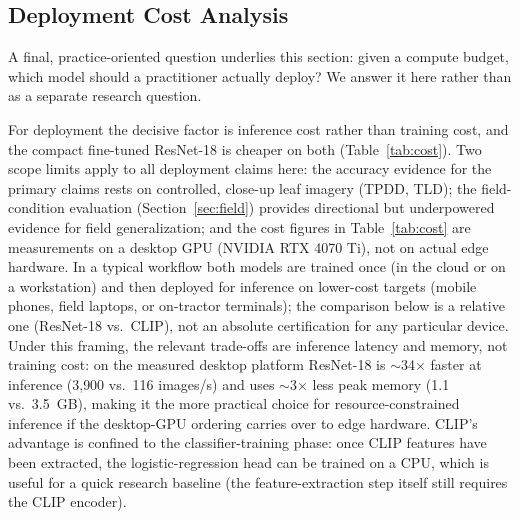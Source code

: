 \documentclass[10pt,a4paper]{article}
\begin{document}
\subsection{Deployment Cost Analysis}

A final, practice-oriented question underlies this section: given a compute budget, which model should a practitioner actually deploy? We answer it here rather than as a separate research question.

For deployment the decisive factor is inference cost rather than training cost, and the compact fine-tuned ResNet-18 is cheaper on both (Table~\ref{tab:cost}). Two scope limits apply to all deployment claims here: the accuracy evidence for the primary claims rests on controlled, close-up leaf imagery (TPDD, TLD); the field-condition evaluation (Section~\ref{sec:field}) provides directional but underpowered evidence for field generalization; and the cost figures in Table~\ref{tab:cost} are measurements on a desktop GPU (NVIDIA RTX 4070 Ti), not on actual edge hardware.
In a typical workflow both models are trained once (in the cloud or on a workstation) and then deployed for inference on lower-cost targets (mobile phones, field laptops, or on-tractor terminals); the comparison below is a relative one (ResNet-18 vs.\ CLIP), not an absolute certification for any particular device.
Under this framing, the relevant trade-offs are inference latency and memory, not training cost: on the measured desktop platform ResNet-18 is $\sim$34$\times$ faster at inference (3{,}900 vs.\ 116 images/s) and uses $\sim$3$\times$ less peak memory (1.1 vs.\ 3.5~GB), making it the more practical choice for resource-constrained inference if the desktop-GPU ordering carries over to edge hardware.
CLIP's advantage is confined to the classifier-training phase: once CLIP features have been extracted, the logistic-regression head can be trained on a CPU, which is useful for a quick research baseline (the feature-extraction step itself still requires the CLIP encoder).
\end{document}
